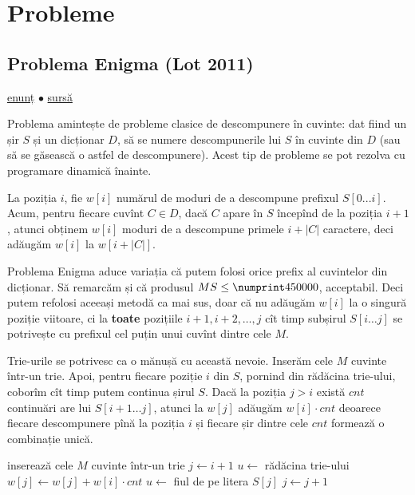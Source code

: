\documentclass[../main.tex]{subfiles}
\begin{document}
\section{Probleme}

\subsection{Problema Enigma (Lot 2011)}
\label{problem:enigma}

\href{https://kilonova.ro/problems/2228}{enunț}
$\bullet$
\hyperref[code:enigma]{sursă}

Problema amintește de probleme clasice de descompunere în cuvinte: dat fiind un șir $S$ și un dicționar $D$, să se numere descompunerile lui $S$ în cuvinte din $D$ (sau să se găsească o astfel de descompunere). Acest tip de probleme se pot rezolva cu programare dinamică înainte.

La poziția $i$, fie $w[i]$ numărul de moduri de a descompune prefixul $S[0...i]$. Acum, pentru fiecare cuvînt $C \in D$, dacă $C$ apare în $S$ începînd de la poziția $i + 1$, atunci obținem $w[i]$ moduri de a descompune primele $i + |C|$ caractere, deci adăugăm $w[i]$ la $w[i + |C|]$.

Problema Enigma aduce variația că putem folosi orice prefix al cuvintelor din dicționar. Să remarcăm și că produsul $MS \leq \np{450000}$, acceptabil. Deci putem refolosi aceeași metodă ca mai sus, doar că nu adăugăm $w[i]$ la o singură poziție viitoare, ci la \textbf{toate} pozițiile $i + 1, i + 2, \dots, j$ cît timp subșirul $S[i \dots j]$ se potrivește cu prefixul cel puțin unui cuvînt dintre cele $M$.

Trie-urile se potrivesc ca o mănușă cu această nevoie. Inserăm cele $M$ cuvinte într-un trie. Apoi, pentru fiecare poziție $i$ din $S$, pornind din rădăcina trie-ului, coborîm cît timp putem continua șirul $S$. Dacă la poziția $j > i$ există $cnt$ continuări are lui $S[i + 1 \dots j]$, atunci la $w[j]$ adăugăm $w[i] \cdot cnt$ deoarece fiecare descompunere pînă la poziția $i$ și fiecare șir dintre cele $cnt$ formează o combinație unică.

\begin{algorithm}[H]
  \caption{Algoritmul în ansamblu pentru problema Enigma}
  \begin{algorithmic}[1]
    \State inserează cele $M$ cuvinte într-un trie
      \State $j \gets i + 1$
      \State $u \gets$ rădăcina trie-ului
        \State $w[j] \gets w[j] + w[i] \cdot cnt$
        \State $u \gets $ fiul de pe litera $S[j]$
        \State $j \gets j + 1$
      \EndWhile
    \EndFor
  \end{algorithmic}
\end{algorithm}
\end{document}
